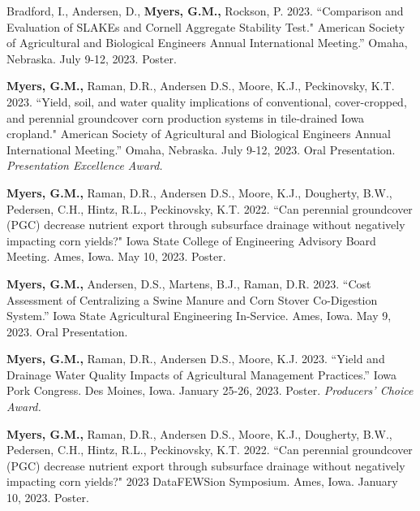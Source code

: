 

\begin{cvparagraph}

    Bradford, I., Andersen, D., \textbf{Myers, G.M., } Rockson, P. 2023. “Comparison and Evaluation of SLAKEs and Cornell Aggregate Stability Test." American Society of Agricultural and Biological Engineers Annual International Meeting.” Omaha, Nebraska. July 9-12, 2023. Poster. 

    \textbf{Myers, G.M., }Raman, D.R.,  Andersen D.S., Moore, K.J., Peckinovsky, K.T. 2023. “Yield, soil, and water quality implications of conventional, cover-cropped, and perennial groundcover corn production systems in tile-drained Iowa cropland." American Society of Agricultural and Biological Engineers Annual International Meeting.” Omaha, Nebraska. July 9-12, 2023. Oral Presentation. \color{awesome}\textit{Presentation Excellence Award.}\color{darktext}
 
    \textbf{Myers, G.M., }Raman, D.R.,  Andersen D.S., Moore, K.J., Dougherty, B.W., Pedersen, C.H., Hintz, R.L., Peckinovsky, K.T. 2022. “Can perennial groundcover (PGC) decrease nutrient export through subsurface drainage without negatively impacting corn yields?" Iowa State College of Engineering Advisory Board Meeting. Ames, Iowa. May 10, 2023. Poster. 

    \textbf{Myers, G.M., }Andersen, D.S., Martens, B.J., Raman, D.R. 2023. “Cost Assessment of Centralizing a Swine Manure and Corn Stover Co-Digestion System.” Iowa State Agricultural Engineering In-Service. Ames, Iowa. May 9, 2023. Oral Presentation.
    
   \textbf{Myers, G.M., }Raman, D.R.,  Andersen D.S., Moore, K.J. 2023. “Yield and Drainage Water Quality Impacts of Agricultural Management Practices.” Iowa Pork Congress. Des Moines, Iowa. January 25-26, 2023. Poster. \color{awesome}\textit{Producers' Choice Award.} \color{darktext}
   
   \textbf{Myers, G.M., }Raman, D.R.,  Andersen D.S., Moore, K.J., Dougherty, B.W., Pedersen, C.H., Hintz, R.L., Peckinovsky, K.T. 2022. “Can perennial groundcover (PGC) decrease nutrient export through subsurface drainage without negatively impacting corn yields?" 2023 DataFEWSion Symposium. Ames, Iowa. January 10, 2023. Poster. 


\end{cvparagraph}
